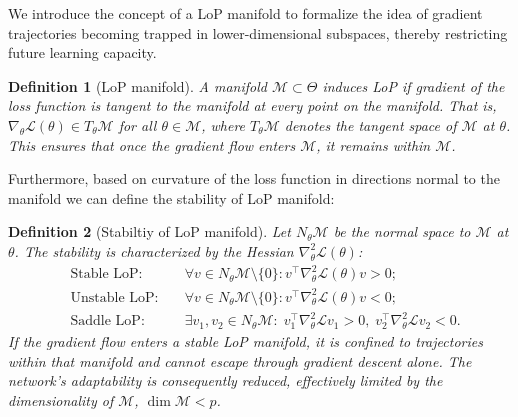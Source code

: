\documentclass{article}
\newcommand{\Loss}{\mathcal{L}}
\newcommand{\mf}[1]{\todo[color=orange!30,size=\tiny]{MF: #1}}
\newtheorem{definition}{Definition}[section]
\begin{document}
We introduce the concept of a LoP manifold to formalize the idea of gradient trajectories becoming trapped in lower-dimensional subspaces, thereby restricting future learning capacity.

\begin{definition}[LoP manifold]
\label{def:lop}
A  manifold $\mathcal{M}\subset\Theta$ induces LoP if gradient of the loss function is tangent to the manifold at every point on the manifold. That is, $\nabla_\theta\Loss(\theta)\in T_\theta\mathcal{M}$ for all $\theta\in\mathcal{M}$, where $T_\theta\mathcal{M}$ denotes the tangent space of $\mathcal{M}$ at $\theta$. This ensures that once the gradient flow enters $\mathcal{M}$, it remains within $\mathcal{M}$.
\end{definition}

Furthermore, based on curvature of the loss function in directions normal to the manifold we can define the stability of LoP manifold:

\begin{definition}[Stabiltiy of LoP manifold]
\label{def:lop_stability}
Let $N_\theta\mathcal{M}$ be the normal space to $\mathcal{M}$ at $\theta$. The stability is characterized by the Hessian $\nabla_\theta^2\Loss(\theta)$: \vspace{-4pt}
        \begin{align}
        &\text{Stable LoP:}\; &&\forall v\in N_\theta\mathcal{M}\setminus\{0\}: v^\top\nabla_\theta^2\Loss(\theta)v > 0; \label{eq:stable}\\
        &\text{Unstable LoP:}\; &&\forall v\in N_\theta\mathcal{M}\setminus\{0\}: v^\top\nabla_\theta^2\Loss(\theta)v < 0; \label{eq:unstable}\\
        &\text{Saddle LoP:}\; &&\exists v_1,v_2\in N_\theta\mathcal{M}:\; v_1^\top\nabla_\theta^2\Loss v_1>0,\; v_2^\top\nabla_\theta^2\Loss v_2<0. \label{eq:saddle}
        \end{align}
If the gradient flow enters a \emph{stable} LoP manifold, it is confined to trajectories within that manifold and cannot escape through gradient descent alone. The network's adaptability is consequently reduced, effectively limited by the dimensionality of $\mathcal{M}$, $\dim\mathcal{M} < p$.
\end{definition}
\end{document}

